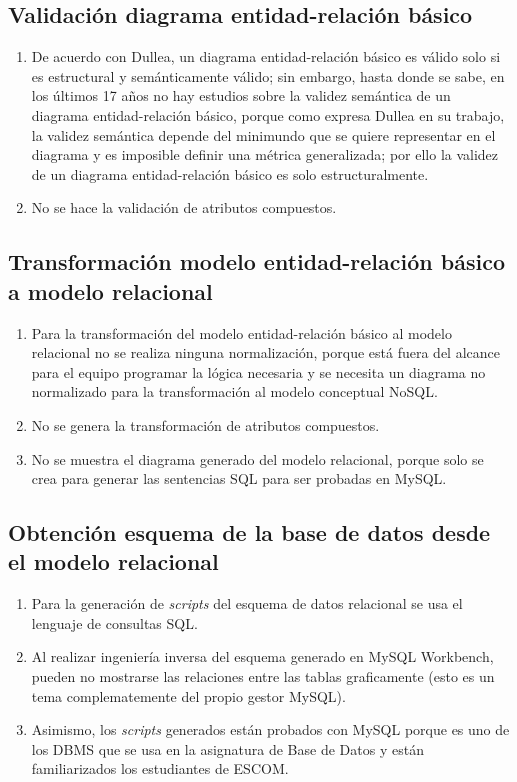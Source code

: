 \subsection*{Validación diagrama entidad-relación básico}
\begin{enumerate}
    \item De acuerdo con Dullea\cite{dullea_analysis_2003}, un diagrama entidad-relación básico es válido solo si es estructural y semánticamente válido; sin embargo, hasta donde se sabe, en los últimos 17 años no hay estudios sobre la validez semántica de un diagrama entidad-relación básico, porque como expresa Dullea en su trabajo, la validez semántica depende del minimundo que se quiere representar en el diagrama y es imposible definir una métrica generalizada; por ello la validez de un diagrama entidad-relación básico es solo estructuralmente.
    \item No se hace la validación de atributos compuestos.

\end{enumerate}

\subsection*{Transformación modelo entidad-relación básico a modelo relacional}
\begin{enumerate}
    \item Para la transformación del modelo entidad-relación básico al modelo relacional no se realiza ninguna normalización, porque está fuera del alcance para el equipo programar la lógica necesaria y se necesita un diagrama no normalizado para la transformación al modelo conceptual NoSQL.
    \item No se genera la transformación de atributos compuestos.
    \item No se muestra el diagrama generado del modelo relacional, porque solo se crea para generar las sentencias SQL para ser probadas en MySQL.
\end{enumerate}

\subsection*{Obtención esquema de la base de datos desde el modelo relacional}
\begin{enumerate}
    \item Para la generación de \textit{scripts} del esquema de datos relacional se usa el lenguaje de consultas SQL.
    \item Al realizar ingeniería inversa del esquema generado en MySQL Workbench, pueden no mostrarse las relaciones entre las tablas graficamente (esto es un tema complematemente del propio gestor MySQL). 
    \item Asimismo, los \textit{scripts} generados están probados con MySQL porque es uno de los DBMS que se usa en la asignatura de Base de Datos y están familiarizados los estudiantes de ESCOM.
\end{enumerate}

